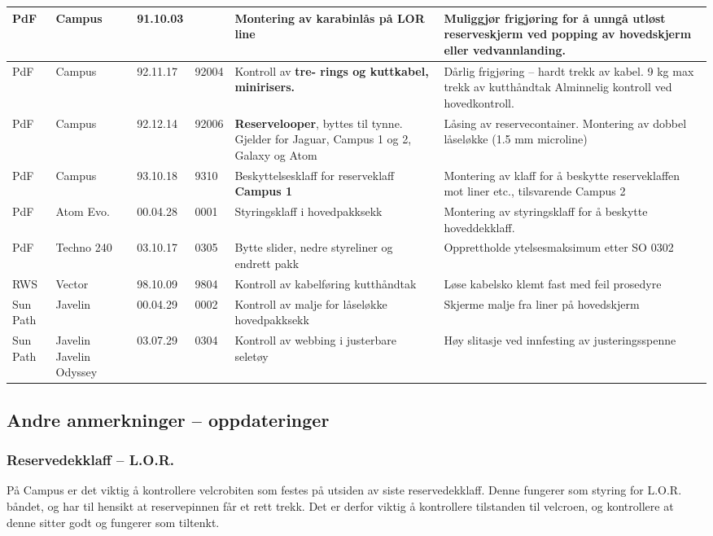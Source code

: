\begin{table}
\begin{tabular}{ | p{1cm} | p{1cm} | p{1cm} | p{1cm} | p{3cm} | p{3cm} | }
		\hline
		PdF & Campus & 91.10.03 & & Montering av \textbf{karabinlås} på \textbf{LOR} line & Muliggjør frigjøring for å unngå utløst reserveskjerm ved popping av hovedskjerm eller vedvannlanding. \\
		\hline
		PdF & Campus & 92.11.17 & 92004 & Kontroll av \textbf{tre- rings og kuttkabel, minirisers.} & Dårlig frigjøring – hardt trekk av kabel. 9 kg max trekk av kutthåndtak Alminnelig kontroll ved hovedkontroll. \\
		\hline
		PdF & Campus & 92.12.14 & 92006 & \textbf{Reservelooper}, byttes til tynne. Gjelder for Jaguar, Campus 1 og 2, Galaxy og Atom & Låsing av reservecontainer. Montering av dobbel låseløkke (1.5 mm microline) \\
		\hline
		PdF & Campus & 93.10.18 & 9310 & Beskyttelsesklaff for reserveklaff \textbf{Campus 1} & Montering av klaff for å beskytte reserveklaffen mot liner etc., tilsvarende Campus 2 \\
		\hline
		PdF & Atom Evo. & 00.04.28 & 0001 & Styringsklaff i hovedpakksekk & Montering av styringsklaff for å beskytte hoveddekklaff. \\
		\hline
		PdF & Techno 240 & 03.10.17 & 0305 & Bytte slider, nedre styreliner og endrett pakk & Opprettholde ytelsesmaksimum etter SO 0302 \\
		\hline
		RWS & Vector & 98.10.09 & 9804 & Kontroll av kabelføring kutthåndtak & Løse kabelsko klemt fast med feil prosedyre \\
		\hline
		Sun Path & Javelin & 00.04.29 & 0002 & Kontroll av malje for låseløkke hovedpakksekk & Skjerme malje fra liner på hovedskjerm \\
		\hline
		Sun Path & Javelin Javelin Odyssey & 03.07.29 & 0304 & Kontroll av webbing i justerbare seletøy & Høy slitasje ved innfesting av justeringsspenne \\
		\hline
	\end{tabular}
\end{table}

\subsection{Andre anmerkninger – oppdateringer}
\subsubsection{Reservedekklaff – L.O.R.}
På Campus er det viktig å kontrollere velcrobiten som festes på utsiden av siste reservedekklaff. Denne fungerer som styring for L.O.R. båndet, og har til hensikt at reservepinnen får et rett trekk. Det er derfor viktig å kontrollere tilstanden til velcroen, og kontrollere at denne sitter godt og fungerer som tiltenkt.

